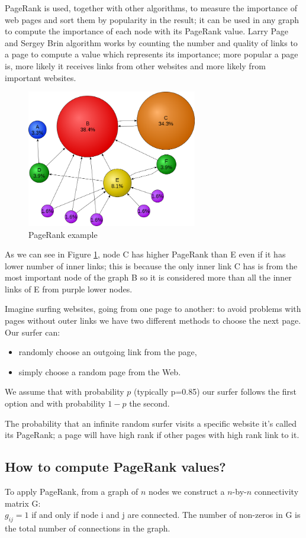 \documentclass[]{usiinfbachelorproject}
\begin{document}
PageRank is used, together with other algorithms, to measure the importance of web pages and sort them by popularity in the result; it can be used in any graph to compute the importance of each node with its PageRank value. Larry Page and  Sergey Brin algorithm works by counting the number and quality of links to a page to compute a value which represents its importance; more popular a page is, more likely it receives links from other websites and more likely from important websites.

\begin{figure}[ht]
	\centering
	\includegraphics[height=6cm]{img/page_rank_example.png}
	\caption{PageRank example}
	\label{fig:prexample}
\end{figure}

As we can see in Figure \ref{fig:prexample}, node C has higher PageRank than E even if it has lower number of inner links; this is because the only inner link C has is from the most important node of the graph B so it is considered more than all the inner links of E from purple lower nodes.

Imagine surfing websites, going from one page to another: to avoid problems with pages without outer links we have two different methods to choose the next page. Our surfer can:
\begin{itemize}
\item randomly choose an outgoing link from the page,
\item simply choose a random page from the Web.
\end{itemize}
We assume that with probability $p$ (typically p=0.85) our surfer follows the first option and with probability $1-p$ the second.

The probability that an infinite random surfer visits a specific website it's called its PageRank; a page will have high rank if other pages with high rank link to it.
\subsection{How to compute PageRank values?}
To apply PageRank, from a graph of $n$ nodes we construct a $n$-by-$n$ connectivity matrix G:\\ $g_{ij}=1$ if and only if node i and j are connected. The number of non-zeros in G is the total number of connections in the graph.
\end{document}
